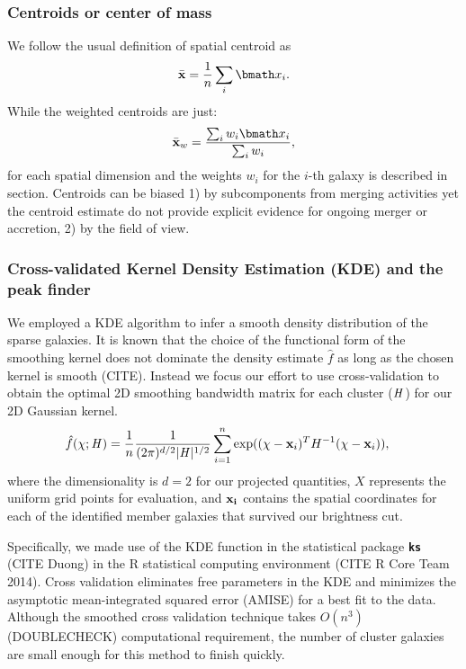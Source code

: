 \subsubsection{Centroids or center of mass}
\label{Unweighted}
We follow the usual definition of spatial centroid as 
\begin{equation}
	\bar{\bf x} = \frac{1}{n} \sum_i \vec{x}_i. 
\end{equation}
While the weighted centroids are just: 
\begin{equation}
	\bar{\bf x}_w = \frac{\sum_i w_i \vec{x}_i}{\sum_i w_i},
\end{equation}
for each spatial dimension and the weights $w_i$ for the $i$-th galaxy
is described in section.
Centroids can be biased 1) by subcomponents from merging activities yet the
centroid estimate do not provide explicit evidence for ongoing merger or 
accretion, 2) by the field of view.

\subsubsection{Cross-validated Kernel Density Estimation (KDE) and the peak finder} 
\label{subsubsec:KDE}
We employed a KDE algorithm to infer a smooth density distribution of the
sparse galaxies.
It is known that the choice of the functional form of the smoothing kernel does
not dominate the density estimate $\hat{f}$ as long as the chosen kernel is
smooth (CITE). Instead we focus our effort to use cross-validation to obtain the optimal 2D smoothing
bandwidth matrix for each cluster ($\mathbf{\it H}$) for our 2D Gaussian kernel. 
\begin{align}
	\hat{f}(\chi; \mathbf{\it H}) &= \frac{1}{n} \frac{1}{(2\pi)^{d/2}|\mathbf{\it H}|^{1/2}}
	\sum_{i=1}^n \exp((\chi-{\bf x}_i)^T H^{-1} (\chi-{\bf x}_i)),
\end{align}
where the dimensionality is $d=2$ for our projected quantities,
$X$ represents the uniform grid points for evaluation, and 
$\bf{x}_i$ contains the spatial coordinates for each of the identified member 
galaxies that survived our brightness cut.

Specifically, we made use of the KDE function in
the statistical package {\bf \texttt{ks}} (CITE Duong) in the R statistical 
computing environment (CITE R Core Team 2014).
Cross validation eliminates free parameters in the KDE and minimizes
the asymptotic mean-integrated squared error (AMISE) for a best fit to the
data. Although the smoothed cross validation technique takes $O(n^3)$
(DOUBLECHECK) computational requirement, the number of cluster galaxies are
small enough for this method to finish quickly. 

